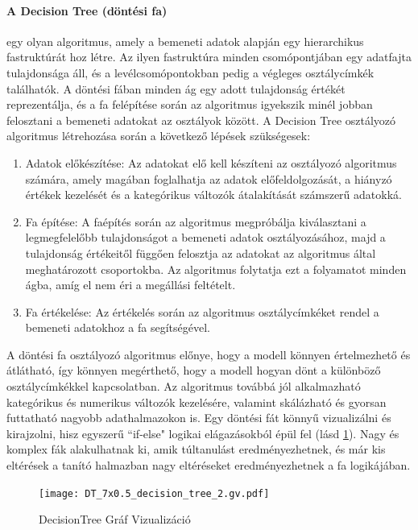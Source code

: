 \documentclass[12pt,a4paper]{article}
\begin{document}
\paragraph{A Decision Tree (döntési fa)} egy olyan algoritmus, amely a bemeneti adatok alapján egy hierarchikus fastruktúrát hoz létre. Az ilyen fastruktúra minden csomópontjában egy adatfajta tulajdonsága áll, és a levélcsomópontokban pedig a végleges osztálycímkék találhatók. A döntési fában minden ág egy adott tulajdonság értékét reprezentálja, és a fa felépítése során az algoritmus igyekszik minél jobban felosztani a bemeneti adatokat az osztályok között.
A Decision Tree osztályozó algoritmus létrehozása során a következő lépések szükségesek:
\begin{enumerate}
    \item Adatok előkészítése: Az adatokat elő kell készíteni az osztályozó algoritmus számára, amely magában foglalhatja az adatok előfeldolgozását, a hiányzó értékek kezelését és a kategórikus változók átalakítását számszerű adatokká.
    \item Fa építése: A faépítés során az algoritmus megpróbálja kiválasztani a legmegfelelőbb tulajdonságot a bemeneti adatok osztályozásához, majd a tulajdonság értékeitől függően felosztja az adatokat az algoritmus által meghatározott csoportokba. Az algoritmus folytatja ezt a folyamatot minden ágba, amíg el nem éri a megállási feltételt.
    \item Fa értékelése: Az értékelés során az algoritmus osztálycímkéket rendel a bemeneti adatokhoz a fa segítségével.
\end{enumerate}
A döntési fa osztályozó algoritmus előnye, hogy a modell könnyen értelmezhető és átlátható, így könnyen megérthető, hogy a modell hogyan dönt a különböző osztálycímkékkel kapcsolatban. Az algoritmus továbbá jól alkalmazható kategórikus és numerikus változók kezelésére, valamint skálázható és gyorsan futtatható nagyobb adathalmazokon is.
Egy döntési fát könnyű vizualizálni és kirajzolni, hisz egyszerű ``if-else" logikai elágazásokból épül fel (lásd \ref{DTVis}). Nagy és komplex fák alakulhatnak ki, amik túltanulást eredményezhetnek, és már kis eltérések a tanító halmazban nagy eltéréseket eredményezhetnek a fa logikájában.

\begin{figure}[htbp]
    \centering
    \texttt{[image: DT\_7x0.5\_decision\_tree\_2.gv.pdf]}
    \caption{DecisionTree Gráf Vizualizáció}
    \label{DTVis}
\end{figure}
\end{document}

